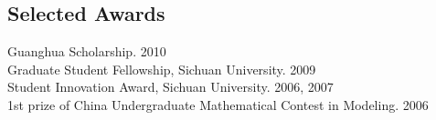 \documentclass[line,margin]{res}
\begin{document}
\begin{resume}
%
 
\section{\sc Selected Awards}


Guanghua Scholarship.  \hfill       2010\\
Graduate Student Fellowship, Sichuan University.  \hfill       2009\\
Student Innovation Award, Sichuan University.  \hfill       2006, 2007 \\%
1st prize of China Undergraduate Mathematical Contest in Modeling.  \hfill       2006



\end{resume}

%
%
\end{document}
